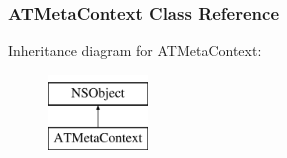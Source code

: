 \hypertarget{interface_a_t_meta_context}{
\subsubsection{ATMetaContext Class Reference}
\label{interface_a_t_meta_context}
}
Inheritance diagram for ATMetaContext:\begin{figure}[h]
\begin{center}
\leavevmode
\includegraphics[height=2.000000cm]{interface_a_t_meta_context}
\end{center}
\end{figure}
